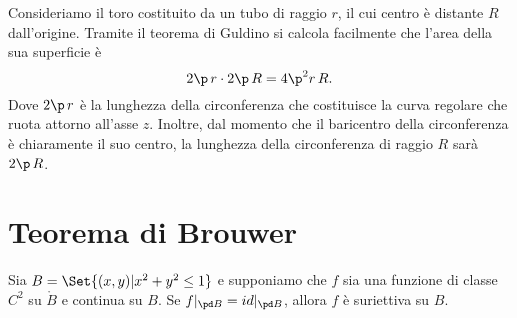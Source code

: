 \begin{ese}
	Consideriamo il toro costituito da un tubo di raggio \(r\), il cui centro è distante \(R\) dall'origine.
	Tramite il teorema di Guldino si calcola facilmente che l'area della sua superficie è
	\[
		2\p\,r \cdot 2\p\,R = 4\p^2 r\,R.
	\]
	Dove \(2\p\,r\) è la lunghezza della circonferenza che costituisce la curva regolare che ruota attorno all'asse \(z\).
	Inoltre, dal momento che il baricentro della circonferenza è chiaramente il suo centro, la lunghezza della circonferenza di raggio \(R\) sarà \(2\p\,R\).
\end{ese}
%
%
\section{Teorema di Brouwer}

\begin{lem}
	Sia \(B=\Set{(x,y) | x^2+y^2 \le 1}\) e supponiamo che \(f\) sia una funzione di classe \(C^2\) su \(\mathring{B}\) e continua su \(B\).
	Se \(f|_{\pd B} = id|_{\pd B}\), allora \(f\) è suriettiva su \(B\).
\end{lem}

